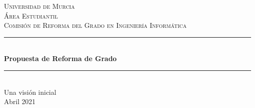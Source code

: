 \begin{titlepage}

\newcommand{\HRule}{\rule{\linewidth}{0.5mm}}

\center %
 

\textsc{\LARGE Universidad de Murcia}\\[1.5cm]
\textsc{\Large
Área Estudiantil \\
Comisión de Reforma del Grado en Ingeniería Informática}\\[0.5cm]


\HRule \\[0.4cm]
{ \huge \bfseries
    Propuesta de Reforma de Grado
} \\[0.4cm]
\HRule \\[0.5cm]

{\large Una visión inicial}\\[2cm]
 


{\large Abril 2021}\\[2cm]

\end{titlepage}
